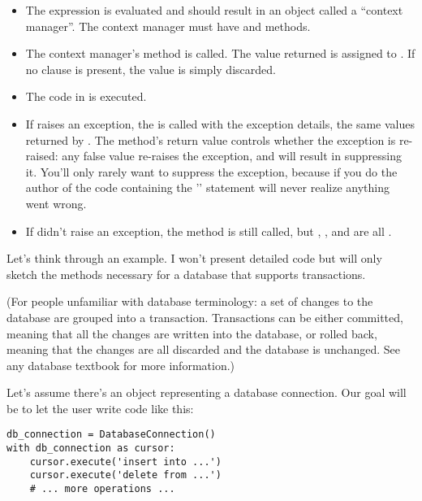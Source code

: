 \documentclass{howto}
\begin{document}
\begin{itemize}

\item The expression is evaluated and should result in an object
called a ``context manager''.  The context manager must have
 and  methods.

\item The context manager's  method is called.  The value
returned is assigned to .  If no  clause
is present, the value is simply discarded.

\item The code in  is executed.

\item If  raises an exception, the
 is called
with the exception details, the same values returned by
.  The method's return value controls whether
the exception is re-raised: any false value re-raises the exception,
and  will result in suppressing it.  You'll only rarely
want to suppress the exception, because if you do
the author of the code containing the
'' statement will never realize anything went wrong.

\item If  didn't raise an exception, 
the  method is still called,
but , , and  are all .

\end{itemize}

Let's think through an example.  I won't present detailed code but
will only sketch the methods necessary for a database that supports
transactions.

(For people unfamiliar with database terminology: a set of changes to
the database are grouped into a transaction.  Transactions can be
either committed, meaning that all the changes are written into the
database, or rolled back, meaning that the changes are all discarded
and the database is unchanged.  See any database textbook for more
information.)

Let's assume there's an object representing a database connection.
Our goal will be to let the user write code like this:

\begin{verbatim}
db_connection = DatabaseConnection()
with db_connection as cursor:
    cursor.execute('insert into ...')
    cursor.execute('delete from ...')
    # ... more operations ...
\end{verbatim}
\end{document}
